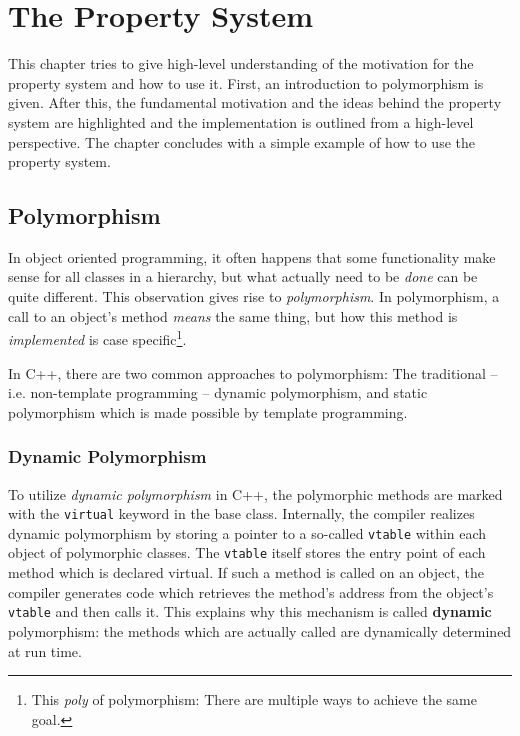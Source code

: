 \chapter{The \Dumux Property System}
\label{sec:propertysytem}

This chapter tries to give high-level understanding of the motivation
for the \Dumux property system and how to use it. First, an
introduction to polymorphism is given. After this, the fundamental
motivation and the ideas behind the \Dumux property system are
highlighted and the implementation is outlined from a high-level
perspective. The chapter concludes with a simple example of how to use
the \Dumux property system.

\section{Polymorphism}

In object oriented programming, it often happens that some
functionality make sense for all classes in a hierarchy, but what
actually need to be \textit{done} can be quite different. This
observation gives rise to \textit{polymorphism}. In polymorphism, a
call to an object's method \textit{means} the same thing, but how this
method is \textit{implemented} is case specific\footnote{This
  \textit{poly} of polymorphism: There are multiple ways to achieve
  the same goal.}.

In C++, there are two common approaches to polymorphism: The
traditional -- i.e. non-template programming -- dynamic polymorphism,
and static polymorphism which is made possible by template
programming.

\subsection*{Dynamic Polymorphism}

To utilize \textit{dynamic polymorphism} in C++, the polymorphic
methods are marked with the \texttt{virtual} keyword in the base
class. Internally, the compiler realizes dynamic polymorphism by
storing a pointer to a so-called \texttt{vtable} within each object of
polymorphic classes. The \texttt{vtable} itself stores the entry point
of each method which is declared virtual. If such a method is called
on an object, the compiler generates code which retrieves the method's
address from the object's \texttt{vtable} and then calls it. This
explains why this mechanism is called \textbf{dynamic} polymorphism:
the methods which are actually called are dynamically determined at
run time.


